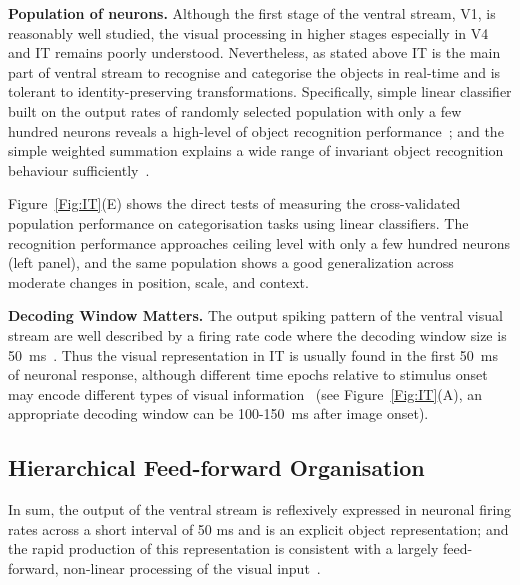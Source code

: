 \documentclass[journal]{journal}
\begin{document}
\textbf{Population of neurons.}
Although the first stage of the ventral stream, V1, is reasonably well studied, the visual processing in higher stages especially in V4 and IT remains poorly understood.
Nevertheless, as stated above IT is the main part of ventral stream to recognise and categorise the objects in real-time and is tolerant to identity-preserving transformations.
Specifically, simple linear classifier built on the output rates of randomly selected population with only a few hundred neurons reveals a high-level of object recognition performance~\cite{hung2005fast};
and the simple weighted summation explains a wide range of invariant object recognition behaviour sufficiently~\cite{majaj2012unified}.

Figure~\ref{Fig:IT}(E) shows the direct tests of measuring the cross-validated population performance on categorisation tasks using linear classifiers.
The recognition performance approaches ceiling level with only a few hundred neurons (left panel), and the same population shows a good generalization across moderate changes in position, scale, and context.

\textbf{Decoding Window Matters.}
The output spiking pattern of the ventral visual stream are well described by a firing rate code where the decoding window size is 50~ms~\cite{hung2005fast}.
Thus the visual representation in IT is usually found in the first 50~ms of neuronal response, although different time epochs relative to stimulus onset may encode different types of visual information~\cite{brincat2006dynamic} (see Figure~\ref{Fig:IT}(A), an appropriate decoding window can be 100-150~ms after image onset).

\subsection{Hierarchical Feed-forward Organisation }
In sum, the output of the ventral stream is reflexively expressed in neuronal firing rates across a short interval of 50 ms and is an explicit object representation;
and the rapid production of this representation is consistent with a largely feed-forward, non-linear processing of the visual input~\cite{dicarlo2012does}.
\end{document}
